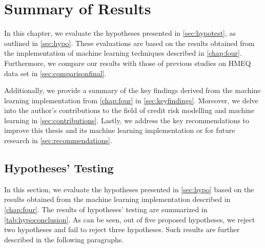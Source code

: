 \chapter{Summary of Results}
\label{chap:five}
In this chapter, we evaluate the hypotheses presented in \autoref{sec:hypotest}, as outlined in \autoref{sec:hypo}.
These evaluations are based on the results obtained from the implementation of machine learning techniques described in \autoref{chap:four}. 
Furthermore, we compare our results with those of previous studies on HMEQ data set \citep{serkan2021bagging,zurada2014classification} in \autoref{sec:comparisonfinal}.

Additionally, we provide a summary of the key findings derived from the machine learning implementation from \autoref{chap:four} in  \autoref{sec:keyfindings}. 
Moreover, we delve into the author's contributions to the field of credit risk modelling and machine learning in \autoref{sec:contributions}.
Lastly, we address the key recommendations to improve this thesis and its machine learning implementation or for future research in \autoref{sec:recommendations}.

\section{Hypotheses' Testing}
\label{sec:hypotest}

In this section, we evaluate the hypotheses presented in \autoref{sec:hypo} based on the results obtained from the machine learning implementation described in \autoref{chap:four}. The results of hypotheses' testing are summarized in \autoref{tab:hypoconclusion}.
As can be seen, out of five proposed hypotheses, we reject two hypotheses and fail to reject three hypotheses. Such results are further described in the following paragraphs.

